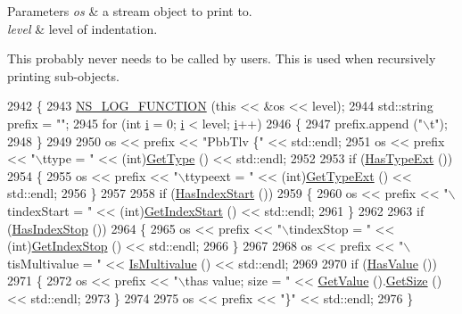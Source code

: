 \begin{DoxyParams}{Parameters}
{\em os} & a stream object to print to. \\
\hline
{\em level} & level of indentation.\\
\hline
\end{DoxyParams}
This probably never needs to be called by users. This is used when recursively printing sub-\/objects. 
\begin{DoxyCode}
2942 \{
2943   \hyperlink{log-macros-disabled_8h_a90b90d5bad1f39cb1b64923ea94c0761}{NS\_LOG\_FUNCTION} (\textcolor{keyword}{this} << &os << level);
2944   std::string prefix = \textcolor{stringliteral}{""};
2945   \textcolor{keywordflow}{for} (\textcolor{keywordtype}{int} \hyperlink{bernuolliDistribution_8m_a6f6ccfcf58b31cb6412107d9d5281426}{i} = 0; \hyperlink{bernuolliDistribution_8m_a6f6ccfcf58b31cb6412107d9d5281426}{i} < level; \hyperlink{bernuolliDistribution_8m_a6f6ccfcf58b31cb6412107d9d5281426}{i}++)
2946     \{
2947       prefix.append (\textcolor{stringliteral}{"\(\backslash\)t"});
2948     \}
2949 
2950   os << prefix << \textcolor{stringliteral}{"PbbTlv \{"} << std::endl;
2951   os << prefix << \textcolor{stringliteral}{"\(\backslash\)ttype = "} << (int)\hyperlink{classns3_1_1PbbTlv_a2a44832293fdd80640da9bf24d82b2ff}{GetType} () << std::endl;
2952 
2953   \textcolor{keywordflow}{if} (\hyperlink{classns3_1_1PbbTlv_ad575ee9c8a0cc8e5fc89d45e38f653ab}{HasTypeExt} ())
2954     \{
2955       os << prefix << \textcolor{stringliteral}{"\(\backslash\)ttypeext = "} << (int)\hyperlink{classns3_1_1PbbTlv_a9ab192074bd17f19b3a812d11175154b}{GetTypeExt} () << std::endl;
2956     \}
2957 
2958   \textcolor{keywordflow}{if} (\hyperlink{classns3_1_1PbbTlv_a41146c67e4e544b5a4b4c19153cd5799}{HasIndexStart} ())
2959     \{
2960       os << prefix << \textcolor{stringliteral}{"\(\backslash\)tindexStart = "} << (int)\hyperlink{classns3_1_1PbbTlv_afdd989dcab3efa5f7e78a5a15fe17f68}{GetIndexStart} () << std::endl;
2961     \}
2962 
2963   \textcolor{keywordflow}{if} (\hyperlink{classns3_1_1PbbTlv_a9d94effbe915280069d7d9f9df82a936}{HasIndexStop} ())
2964     \{
2965       os << prefix << \textcolor{stringliteral}{"\(\backslash\)tindexStop = "} << (int)\hyperlink{classns3_1_1PbbTlv_abe0c348b07511fb40d656c6392326960}{GetIndexStop} () << std::endl;
2966     \}
2967 
2968   os << prefix << \textcolor{stringliteral}{"\(\backslash\)tisMultivalue = "} << \hyperlink{classns3_1_1PbbTlv_a85d68cdce0833c8285a07d13b05f0d2a}{IsMultivalue} () << std::endl;
2969 
2970   \textcolor{keywordflow}{if} (\hyperlink{classns3_1_1PbbTlv_aaad2c3255366688140ec008a3377d6d4}{HasValue} ())
2971     \{
2972       os << prefix << \textcolor{stringliteral}{"\(\backslash\)thas value; size = "} << \hyperlink{classns3_1_1PbbTlv_a78f4e8e511b90f2b40aca1dd134193c5}{GetValue} ().\hyperlink{classns3_1_1Buffer_a3047b8f2dad303c6370695122f1884f0}{GetSize} () << std::endl;
2973     \}
2974 
2975   os << prefix << \textcolor{stringliteral}{"\}"} << std::endl;
2976 \}
\end{DoxyCode}
